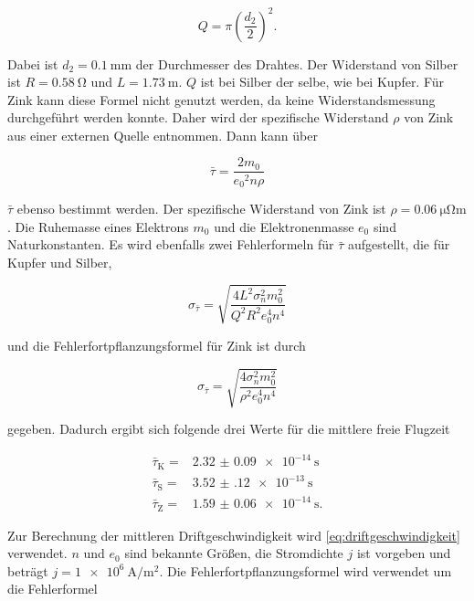 \begin{equation}
    Q = \pi \left(\frac{d_2}{2}\right)^2.
    \label{eq:Q}
\end{equation}

Dabei ist $d_2 = \SI{0.1}{\milli\meter}$ der Durchmesser des Drahtes.
Der Widerstand von Silber ist $R = \SI{0.58}{\ohm}$ und $L = \SI{1.73}{\meter}$.
$Q$ ist bei Silber der selbe, wie bei Kupfer.
Für Zink kann diese Formel nicht genutzt werden, da keine Widerstandsmessung durchgeführt werden konnte.
Daher wird der spezifische Widerstand $\rho$ von Zink aus einer externen Quelle entnommen.
Dann kann über 

\begin{equation}
    \bar{\tau} = \frac{2m_0}{{e_0}^2 n \rho}
    \label{eq:tau2}
\end{equation}

$\bar{\tau}$ ebenso bestimmt werden.
Der spezifische Widerstand von Zink ist $\rho = \SI{0.06}{\micro\ohm\meter}$.\cite{zink}
Die Ruhemasse eines Elektrons $m_0$ und die Elektronenmasse $e_0$ sind Naturkonstanten.\cite{physics_constants}
Es wird ebenfalls zwei Fehlerformeln für $\bar{\tau}$ aufgestellt, die für Kupfer und Silber, 

\begin{equation}
    \sigma _{\bar{\tau}} = \sqrt{\frac{4 L^{2} \sigma_{n}^{2} m_{0}^{2}}{Q^{2} R^{2} e_{0}^{4} n^{4}}}
    \label{eq:tau_fehler}
\end{equation}

und die Fehlerfortpflanzungsformel für Zink ist durch

\begin{equation}
    \sigma _{\bar{\tau}} = \sqrt{\frac{4 \sigma_{n}^{2} m_{0}^{2}}{{\rho}^{2} e_{0}^{4} n^{4}}}
    \label{eq:tau_fehler2}
\end{equation}

gegeben. 
Dadurch ergibt sich folgende drei Werte für die mittlere freie Flugzeit

\begin{align*}
    \bar{\tau}_\text{K} =& \SI{2.32(9)e-14}{\second} \\
    \bar{\tau}_\text{S} =& \SI{3.52(12)e-13}{\second} \\
    \bar{\tau}_\text{Z} =& \SI{1.59(6)e-14}{\second}.
\end{align*}

Zur Berechnung der mittleren Driftgeschwindigkeit wird \autoref{eq:driftgeschwindigkeit} verwendet.
$n$ und $e_0$ sind bekannte Größen, die Stromdichte $j$ ist vorgeben und beträgt $j = \SI{1e6}{\ampere\per\meter\squared}$.
Die Fehlerfortpflanzungsformel wird verwendet um die Fehlerformel

